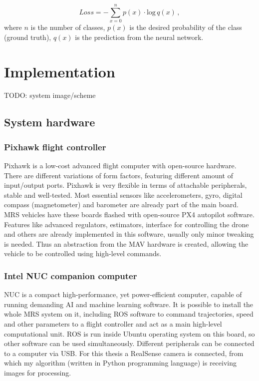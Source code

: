 \begin{equation}
	Loss = -\sum\limits_{x=0}^n p(x)\cdot \textrm{log} \,q(x) \,,
\end{equation}
where $n$ is the number of classes, $p(x)$ is the desired probability of the class (ground truth), $q(x)$ is the prediction from the neural network.




\chapter{Implementation}

TODO: system image/scheme

\section{System hardware}

\subsection{Pixhawk flight controller}

Pixhawk is a low-cost advanced flight computer with open-source hardware. There are different variations of form factors, featuring different amount of input/output ports. Pixhawk is very flexible in terms of attachable peripherals, stable and well-tested. Most essential sensors like accelerometers, gyro, digital compass (magnetometer) and barometer are already part of the main board. MRS vehicles have these boards flashed with open-source PX4 autopilot software. Features like advanced regulators, estimators, interface for controlling the drone and others are already implemented in this software, usually only minor tweaking is needed. Thus an abstraction from the MAV hardware is created, allowing the vehicle to be controlled using high-level commands.


\subsection{Intel NUC companion computer}

NUC is a compact high-performance, yet power-efficient computer, capable of running demanding AI and machine learning software. It is possible to install the whole MRS system on it, including ROS software to command trajectories, speed and other parameters to a flight controller and act as a main high-level computational unit. ROS is run inside Ubuntu operating system on this board, so other software can be used simultaneously. Different peripherals can be connected to a computer via USB. For this thesis a RealSense camera is connected, from which my algorithm (written in Python programming language) is receiving images for processing.

